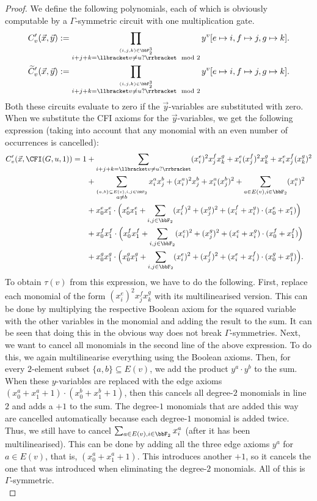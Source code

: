 \documentclass[a4paper,UKenglish,cleveref, autoref, thm-restate]{lipics-v2021}
\begin{document}
\begin{proof}
	We define the following polynomials, each of which is obviously computable by a $\Gamma$-symmetric circuit with one multiplication gate.
	\begin{align*}
		C'_v(\vec x, \vec y) &:= \prod_{\stackrel{(i,j,k) \in \bbF_2^3}{i+j+k = \llbracket v \neq u? \rrbracket \mod 2}} y^v[e \mapsto i, f \mapsto j, g \mapsto k].\\
		\widetilde{C}'_v(\vec x, \vec y) &:= \prod_{\stackrel{(i,j,k) \in \bbF_2^3}{i+j+k = \llbracket v \neq u? \rrbracket \mod 2}} y^v[e \mapsto i, f \mapsto j, g \mapsto k].
	\end{align*}
	Both these circuits evaluate to zero if the $\vec y$-variables are substituted with zero. When we substitute the CFI axioms for the $\vec y$-variables, we get the following expression (taking into account that any monomial with an even number of occurrences is cancelled):
	\begin{align*}
		C'_v(\vec x, \CFI(G, u, 1)) = 1 &+ \sum_{i+j+k = \llbracket v \neq u? \rrbracket} (x^e_i)^2x^f_jx^g_k + x^e_i(x^f_j)^2x^g_k + x^e_ix^f_j(x^g_k)^2\\
		&+ \sum_{\stackrel{\{ a,b\} \subseteq E(v), i,j \in \bbF_2}{a \neq b}} x^a_ix^b_j + (x^a_i)^2x^b_j + x^a_i(x^b_j)^2  + \sum_{a\in E(v), i \in \bbF_2} (x^a_i)^2\\
		&+x^e_0x^e_1 \cdot \Big(x^e_0x^e_1+\sum_{i,j \in \bbF_2} (x^f_i)^2+(x^g_j)^2 + (x_i^f+ x_i^g) \cdot (x_0^e + x_1^e)  \Big)\\
		&+ x^f_0x^f_1 \cdot \Big(x^f_0x^f_1+\sum_{i,j \in \bbF_2} (x^e_i)^2+(x^g_j)^2 + (x_i^e+ x_i^g) \cdot (x_0^f + x_1^f) \Big)\\
		&+ x^g_0x^g_1 \cdot \Big(x^g_0x^g_1+\sum_{i,j \in \bbF_2} (x^e_i)^2+(x^f_j)^2 + (x_i^e+ x_i^f) \cdot (x_0^g + x_1^g) \Big).   
	\end{align*}	
	To obtain $\tau(v)$ from this expression, we have to do the following. First, replace each monomial of the form $(x^e_i)^2x^f_jx^g_k$ with its multilinearised version. This can be done by multiplying the respective Boolean axiom for the squared variable with the other variables in the monomial and adding the result to the sum. It can be seen that doing this in the obvious way does not break $\Gamma$-symmetries. Next, we want to cancel all monomials in the second line of the above expression. To do this, we again multilinearise everything using the Boolean axioms. Then, for every $2$-element subset $\{a,b\} \subseteq E(v)$, we add the product $y^a \cdot y^b$ to the sum. When these $y$-variables are replaced with the edge axioms $(x^a_0 + x^a_1 +1) \cdot (x^b_0 + x^b_1 +1)$, then this cancels all degree-$2$ monomials in line $2$ and adds a $+1$ to the sum. The degree-$1$ monomials that are added this way are cancelled automatically because each degree-$1$ monomial is added twice. Thus, we still have to cancel $\sum_{a\in E(v), i \in \bbF_2} x^a_i$ (after it has been multilinearised). This can be done by adding all the three edge axioms $y^a$ for $a \in E(v)$, that is, $(x^a_0 + x^a_1 +1)$. This introduces another $+1$, so it cancels the one that was introduced when eliminating the degree-$2$ monomials. All of this is $\Gamma$-symmetric.\\

\end{proof}
\end{document}
